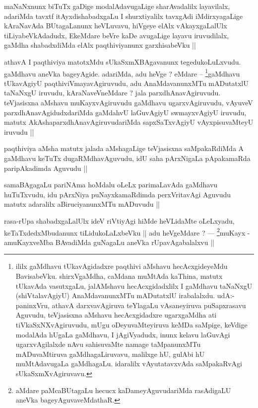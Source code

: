 \begin{artha}
maNaNxnunx biTuTx gaDige modalAdavugaLige sharAvadalilx layavilalx, adariMda tavxtf itAyxdishabadxgaLu I shurxtiyalilx tavxgAdi iMdirxyagaLige kAraNavAda BUtagaLanunx heVLuvavu, hiVgeye elAlx vAkayxgaLalUlx tiLiyabeVkAdadudx, EkeMdare beVre kaDe avugaLige layavu iruvudilalx, gaMdha shabadxdiMda elAlx paqthiviyanunx garxhisabeVku ||
\end{artha}

\begin{artha}
athavA I paqthiviya matotxMdu sUkaSxmXBAgavanunx tegedukoLuLxvudu. gaMdhavu aneVka bageyAgide. adariMda, adu heVge ? eMdare -- \footnote[1]{ililx gaMdhavu tUkavAgidadxre paqthivi aMshavu hecAcxgideyeMdu BavisabeVku. shirxVgaMdha, caMdana muMtAda kaThina, matutx tUkavAda vasutxgaLu, jalAMshavu hecAcxgidadxlilx I gaMdhavu taNaNxgU (shiVtalavAgiyU) AnaMdavanunxMTu mADutatxlU irabalalxdu. udA:- paninxVru, athavA darxvavAgiruva teYlagaLu vAsaneyiruva puSapxrasavu Aguvudu, teVjasisxna aMshavu hecAcxgidadxre ugarxgaMdha ati tiVkaSxNXvAgiruvudu, mUgu oDeyuvaMteyiruva keMDa saMpige, keVdige modalAda hUgaLa gaMdhavu, I jAgiVyadudx, inunx kelavu laGuvAgi ugarxvAgilalxde nAvu sahisuvaMte namage taMpanunxMTu mADuvaMtiruva gaMdhagaLiruvavu, malilxge hU, gulAbi hU muMtAdavugaLa gaMdhagaLu. idaralilx vAyutatavxvAda saMpakaRvAgi sUkaSxmXvAgiruvavu.}gaMdhavu tUkavAgiyU paqthiviVmayavAgiruvudu, adu AnaMdavanunxMTu mADutatxlU taNaNxgU iruvudu, kAraNaveVneMdare ? jala parxdhAnavAgiruvudu. teVjasisxna aMshavu muKayxvAgiruvudu gaMdhavu ugarxvAgiruvudu, vAyuveV parxdhAnavAgidudxdariMda gaMdahvU laGuvAgiyU swmayxvAgiyU iruvudu, matutx AkAshaparxdhAnavAgiruvudariMda sapxSaTxvAgiyU vAyxpisuvaMteyU iruvudu ||
\end{artha}


\begin{artha}
paqthiviya aMsha matutx jalada aMshagaLige teVjasisxna saMpakaRdiMda A gaMdhavu keTuTx dugaRMdhavAguvudu, idU saha pArxNigaLa pApakamaRda paripAkadimda Aguvudu ||
\end{artha}

\begin{artha}
samaBAgagaLu pariNAma hoMdalu oLeLx parimaLavAda gaMdhavu huTuTxvudu, idu pArxNiya puNayxkamaRdimda perxVritavAgi Aguvudu matutx adaralilx aBiruciyanunxMTu mADuvudu ||
\end{artha}

\begin{artha}
rasa-rUpa shabadxgaLalUlx ideV riVtiyAgi hiMde heVLidaMte oLeLxyadu, keTaTxdedxMbudanunx tiLidukoLaLxbeVku || adu heVgeMdare ? --- \footnote[1]{aMdare paMcaBUtagaLu hecucx kaDameyAguvudariMda rasAdigaLU aneVka bageyAguvaveMdathaR.}muKayx - amuKayxveMba BAvadiMda guNagaLu aneVka rUpavAgabalalxvu ||
\end{artha}

